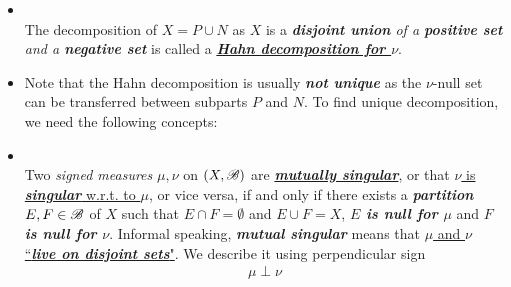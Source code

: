 \documentclass[11pt]{article}
\begin{document}
\begin{itemize}
\begin{proof}
Let $A = \bigcap_{j=1}^{\infty}A_{j}$. Then $\infty > \nu(A)= \lim\limits_{j\rightarrow \infty}\nu(A_{j})> \sum_{j=1}^{\infty}\frac{1}{n_{j}}$ with $n_{j}\rightarrow \infty$. But once again, there exists $B\subset A$ with $\nu(B) \ge \nu(A)+ 1/n$ for some integer $n$. For $j$ sufficiently large, we have $n<n_{j}$, and $B\subset A_{j-1}$, which violates the construction of $A_{j-1}$. So $N$ is not negative is untenable. 

Finally, if $P', N'$ is another pair of sets as stated, we have $P-P'\subset P$ and $P- P'\subset N'$, so that $P-P'$ is both positive and negative, thus it is a null set. \qed
\end{proof}


\item \begin{definition}\citep{folland2013real, resnick2013probability}\\
The decomposition of $X = P\cup N$ as $X$ is a \emph{\textbf{disjoint union} of a \textbf{positive set} and a \textbf{negative set}} is called a \underline{\emph{\textbf{Hahn decomposition for $\nu$}}}.
\end{definition}

\item \begin{remark}
Note that the Hahn decomposition is usually \emph{\textbf{not unique}} as the $\nu$-null set can be transferred between subparts $P$ and $N$. To find unique decomposition, we need the following concepts:
\end{remark}

\item  \begin{definition}\citep{folland2013real}\\
Two \emph{signed measures} $\mu, \nu$ on $(X,{\mathscr B})$ are \underline{\emph{\textbf{mutually singular}}}, or that \underline{$\nu$ is \emph{\textbf{singular}} w.r.t. to $\mu$}, or vice versa, if and only if there exists a \emph{\textbf{partition}} $E,F\in {\mathscr B}$ of $X$ such that $E\cap F = \emptyset$ and $E\cup F= X$, \emph{\textbf{$E$ is null for $\mu$}} and \emph{\textbf{$F$ is null for $\nu$}}.  Informal speaking, \emph{\textbf{mutual singular}} means that \underline{$\mu$ and $\nu$ ``\emph{\textbf{live on disjoint sets}}"}. We describe it using perpendicular sign
\begin{align*}
\mu \perp \nu
\end{align*}
\end{definition}


\end{itemize}
\end{document}
